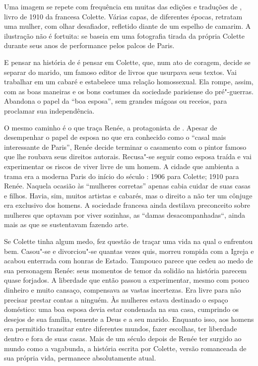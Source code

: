 \begin{multicols}{2}
Uma imagem se repete com frequência em muitas das edições e traduções de {}, livro de 1910 da francesa Colette. Várias capas, de diferentes épocas, retratam uma mulher, com olhar desafiador, refletido diante de um espelho de camarim. A ilustração não é fortuita: se baseia em uma fotografia tirada da própria Colette durante seus anos de performance pelos palcos de Paris. 

E pensar na história de {} é pensar em Colette, que, num ato de coragem, decide se separar do marido, um famoso editor de livros que usurpava seus textos. Vai trabalhar em um cabaré e estabelece uma relação homossexual. Ela rompe, assim, com as boas maneiras e os bons costumes da sociedade parisiense do pré"-guerras. Abandona o papel da “boa esposa”, sem grandes mágoas ou receios, para proclamar sua independência.

O mesmo caminho é o que traça Renée, a protagonista de {}. Apesar de desempenhar o papel de esposa no que era conhecido como o “casal mais interessante de Paris”, Renée decide terminar o casamento com o pintor famoso que lhe roubava seus direitos autorais. Recusa"-se seguir como esposa traída e vai experimentar os riscos de viver livre de um homem. A cidade que ambienta a trama era a moderna Paris do início do século : 1906 para Colette; 1910 para Renée. Naquela ocasião às “mulheres corretas” apenas cabia cuidar de suas casas e filhos. Havia, sim, muitos artistas e cabarés, mas o direito a não ter um cônjuge era exclusivo dos homens. A sociedade francesa ainda destilava preconceito sobre mulheres que optavam por viver sozinhas, as “damas desacompanhadas“, ainda mais as que se sustentavam fazendo arte.

Se Colette tinha algum medo, fez questão de traçar uma vida na qual o enfrentou bem. Casou"-se e divorciou"-se quantas vezes quis, morreu rompida com a Igreja e acabou enterrada com honras de Estado. Tampouco parece que cedeu ao medo de sua personagem Renée: seus momentos de temor da solidão na história parecem quase forjados. A liberdade que então passou a experimentar, mesmo com pouco dinheiro
e muito cansaço, compensava as vastas incertezas. Era livre para não precisar prestar contas a ninguém. Às mulheres estava destinado o espaço doméstico: uma boa esposa devia estar condenada na sua casa, cumprindo os desejos de sua família, temente a Deus e a seu marido. Enquanto isso, aos homens era permitido transitar entre diferentes mundos, fazer escolhas, ter liberdade dentro e fora de suas casas. Mais de um século depois de Renée ter surgido ao mundo como a vagabunda, a história escrita por Colette, versão romanceada de sua própria vida, permanece absolutamente atual.


\end{multicols}
